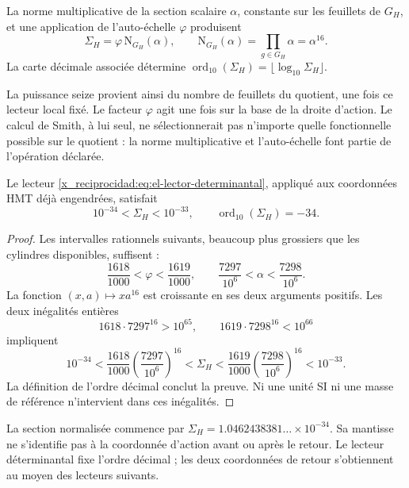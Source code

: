 \begin{definition}
La norme multiplicative de la section scalaire \(\alpha\), constante
sur les feuillets de \(G_H\), et une application de l'auto-échelle
\(\varphi\) produisent
\begin{equation}
 \Sigma_H=\varphi\,\mathrm N_{G_H}(\alpha),\qquad
 \mathrm N_{G_H}(\alpha)=\prod_{g\in G_H}\alpha=\alpha^{16}.
 \label{x_reciprocidad:eq:el-lector-determinantal}
\end{equation}
La carte décimale associée détermine
\(\operatorname{ord}_{10}(\Sigma_H)=\lfloor\log_{10}\Sigma_H\rfloor\).
\end{definition}

La puissance seize provient ainsi du nombre de feuillets du quotient, une
fois ce lecteur local fixé. Le facteur \(\varphi\) agit une fois sur
la base de la droite d'action. Le calcul de Smith, à lui seul, ne
sélectionnerait pas n'importe quelle fonctionnelle possible sur le quotient : la norme
multiplicative et l'auto-échelle font partie de l'opération déclarée.

\begin{theorem}
Le lecteur \eqref{x_reciprocidad:eq:el-lector-determinantal}, appliqué aux coordonnées
HMT déjà engendrées, satisfait
\begin{equation}
 10^{-34}<\Sigma_H<10^{-33},\qquad
 \operatorname{ord}_{10}(\Sigma_H)=-34.
 \label{x_reciprocidad:eq:el-decada}
\end{equation}
\end{theorem}
\begin{proof}
Les intervalles rationnels suivants, beaucoup plus grossiers que les cylindres
disponibles, suffisent :
\[
 \frac{1618}{1000}<\varphi<\frac{1619}{1000},\qquad
 \frac{7297}{10^6}<\alpha<\frac{7298}{10^6}.
\]
La fonction \((x,a)\mapsto xa^{16}\) est croissante en ses deux arguments
positifs. Les deux inégalités entières
\[
 1618\cdot7297^{16}>10^{65},\qquad
 1619\cdot7298^{16}<10^{66}
\]
impliquent
\[
 10^{-34}
 <\frac{1618}{1000}\left(\frac{7297}{10^6}\right)^{16}
 <\Sigma_H
 <\frac{1619}{1000}\left(\frac{7298}{10^6}\right)^{16}
 <10^{-33}.
\]
La définition de l'ordre décimal conclut la preuve. Ni une
unité SI ni une masse de référence n'intervient dans ces inégalités.
\end{proof}

La section normalisée commence par
\(\Sigma_H=1.0462438381\ldots\times10^{-34}\). Sa mantisse ne
s'identifie pas à la coordonnée d'action avant ou après le retour.
Le lecteur déterminantal fixe l'ordre décimal ; les deux coordonnées de
retour s'obtiennent au moyen des lecteurs suivants.


